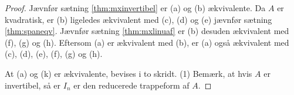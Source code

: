 \begin{proof}
Jævnfør sætning \ref{thm:mxinvertibel} er (a) og (b) ækvivalente. 
Da $A$ er kvadratisk, er (b) ligeledes ækvivalent med (c), (d) og (e) jævnfør sætning \ref{thm:spaneqv}. 
Jævnfør sætning \ref{thm:mxlinuaf} er (b) desuden ækvivalent med (f), (g) og (h). 
Eftersom (a) er ækvivalent med (b), er (a) også ækvivalent med (c), (d), (e), (f), (g) og (h). 

At (a) og (k) er ækvivalente, bevises i to skridt. 
(1) Bemærk, at hvis $A$ er invertibel, så er $I_n$ er den reducerede trappeform af $A$. 
\end{proof}


